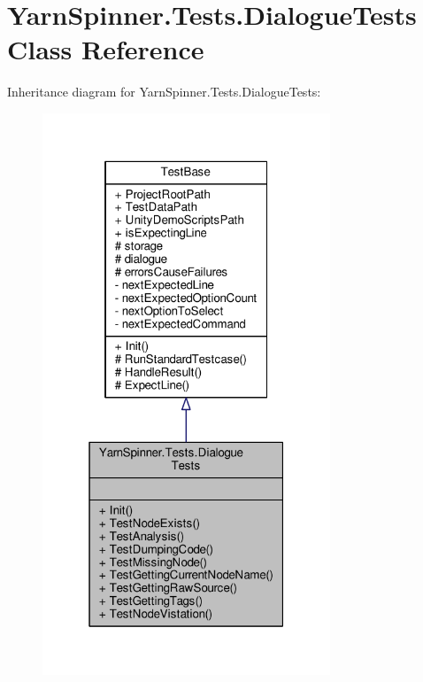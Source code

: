 \hypertarget{a00092}{\section{Yarn\-Spinner.\-Tests.\-Dialogue\-Tests Class Reference}
\label{a00092}
}


Inheritance diagram for Yarn\-Spinner.\-Tests.\-Dialogue\-Tests\-:
\nopagebreak
\begin{figure}[H]
\begin{center}
\leavevmode
\includegraphics[width=244pt]{a00725}
\end{center}
\end{figure}



